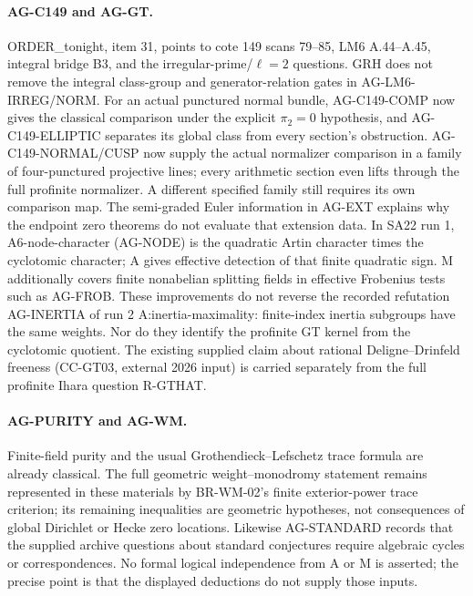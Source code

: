 \paragraph{AG-C149 and AG-GT.} ORDER\_tonight, item 31, points to cote
149 scans 79--85, LM6 A.44--A.45, integral bridge B3, and the
irregular-prime/$\ell=2$ questions. GRH does not remove the integral
class-group and generator-relation gates in AG-LM6-IRREG/NORM.
For an actual punctured normal bundle, AG-C149-COMP now gives the
classical comparison under the explicit $\pi_2=0$ hypothesis, and
AG-C149-ELLIPTIC separates its global class from every section's
obstruction. AG-C149-NORMAL/CUSP now supply the actual normalizer
comparison in a family of four-punctured projective lines; every
arithmetic section even lifts through the full profinite normalizer.
A different specified family still requires its own comparison map.
The semi-graded Euler information in AG-EXT explains why the endpoint
zero theorems do not evaluate that extension data. In SA22 run 1,
A6-node-character (AG-NODE) is the quadratic Artin character times the cyclotomic
character; A gives effective detection of that finite quadratic sign.
M additionally covers finite nonabelian splitting fields in effective
Frobenius tests such as AG-FROB. These improvements do not reverse the
recorded refutation AG-INERTIA of run 2 A:inertia-maximality: finite-index inertia
subgroups have the same weights. Nor do they identify the profinite GT
kernel from the cyclotomic quotient. The existing supplied claim about
rational Deligne--Drinfeld freeness (CC-GT03, external 2026 input) is
carried separately from the full profinite Ihara question R-GTHAT.

\paragraph{AG-PURITY and AG-WM.} Finite-field purity and the usual
Grothendieck--Lefschetz trace formula are already classical. The full
geometric weight--monodromy statement remains represented in these
materials by BR-WM-02's finite exterior-power trace criterion; its
remaining inequalities are geometric hypotheses, not consequences of
global Dirichlet or Hecke zero locations. Likewise AG-STANDARD records that the supplied archive
questions about standard conjectures require algebraic cycles or
correspondences. No formal logical independence from A or M is asserted;
the precise point is that the displayed deductions do not supply those
inputs.

